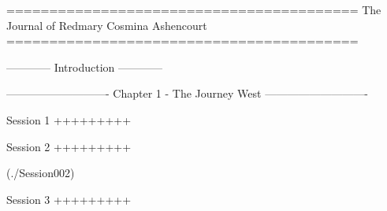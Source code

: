 =========================================
The Journal of Redmary Cosmina Ashencourt
=========================================

	------------
	Introduction
	------------
	
		

	----------------------------
	Chapter 1 - The Journey West
	----------------------------
		
		Session 1
		+++++++++
		
			

		Session 2
		+++++++++
	
			(./Session002)
			
		Session 3
		+++++++++
